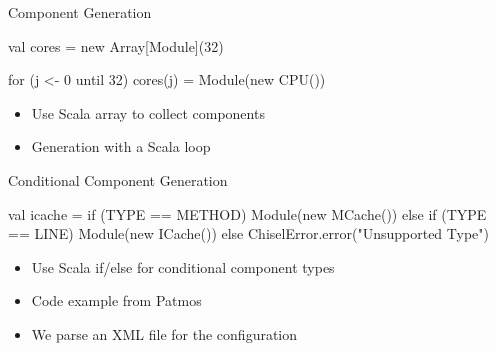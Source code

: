 \documentclass[xcolor=pdflatex,dvipsnames,table]{beamer}
\begin{document}
\begin{frame}[fragile]{Component Generation}
\begin{chisel}
val cores = new Array[Module](32)

for (j <- 0 until 32)
  cores(j) = Module(new CPU())
\end{chisel}
\begin{itemize}
\item Use Scala array to collect components
\item Generation with a Scala loop
\end{itemize}
\end{frame}

\begin{frame}[fragile]{Conditional Component Generation}
\begin{chisel}
val icache =
  if (TYPE == METHOD)
    Module(new MCache())
  else if (TYPE == LINE)
    Module(new ICache())
  else
    ChiselError.error("Unsupported Type")
\end{chisel}
\begin{itemize}
\item Use Scala if/else for conditional component types
\item Code example from Patmos
\item We parse an XML file for the configuration
\end{itemize}
\end{frame}
\end{document}
